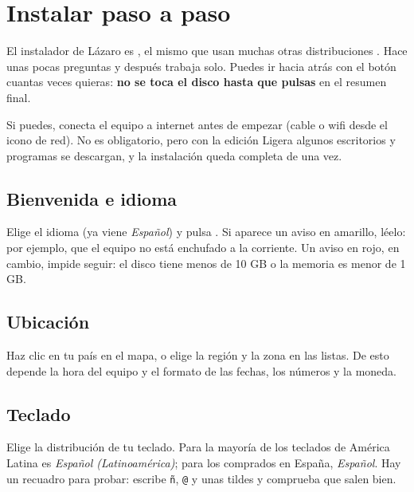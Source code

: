 \chapter{Instalar paso a paso}\label{cap:04-instalar}

El instalador de Lázaro es , el mismo que usan muchas
otras distribuciones \cite{calamares}. Hace unas pocas preguntas y después
trabaja solo. Puedes ir hacia atrás con el botón  cuantas veces
quieras: \textbf{no se toca el disco hasta que pulsas } en el
resumen final.

\begin{consejo}
Si puedes, conecta el equipo a internet antes de empezar (cable o wifi
desde el icono de red). No es obligatorio, pero con la edición Ligera
algunos escritorios y programas se descargan, y la instalación queda
completa de una vez.
\end{consejo}

\section{Bienvenida e idioma}


Elige el idioma (ya viene \emph{Español}) y pulsa . Si
aparece un aviso en amarillo, léelo: por ejemplo, que el equipo no está
enchufado a la corriente. Un aviso en rojo, en cambio, impide seguir: el
disco tiene menos de 10 GB o la memoria es menor de 1 GB.

\section{Ubicación}


Haz clic en tu país en el mapa, o elige la región y la zona en las listas.
De esto depende la hora del equipo y el formato de las fechas, los números
y la moneda.

\section{Teclado}


Elige la distribución de tu teclado. Para la mayoría de los teclados de
América Latina es \emph{Español (Latinoamérica)}; para los comprados en
España, \emph{Español}. Hay un recuadro para probar: escribe \texttt{ñ},
\texttt{@} y unas tildes y comprueba que salen bien.

